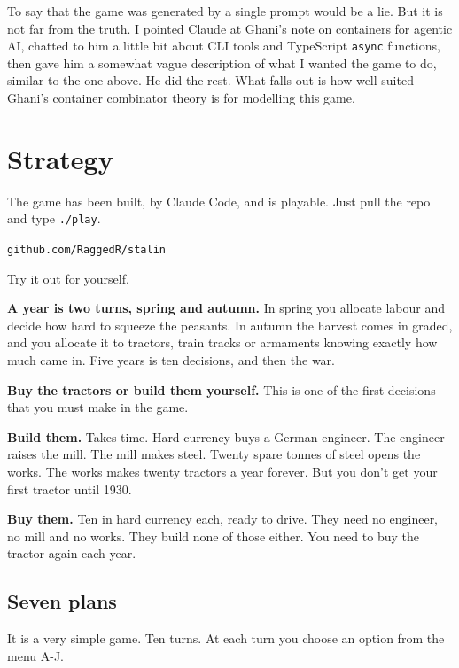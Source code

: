 \documentclass[11pt,a4paper]{article}
\begin{document}
To say that the game was generated by a single prompt would be a lie. But it is not far from the
truth. I pointed Claude at Ghani's note on containers for agentic AI, chatted to him a little bit
about CLI tools and TypeScript \texttt{async} functions, then gave him a somewhat vague description
of what I wanted the game to do, similar to the one above. He did the rest. What falls out is how
well suited Ghani's container combinator theory is for modelling this game.


\newpage

\section{Strategy}
\label{sec:strategy}

\begin{sectionbox}
The game has been built, by Claude Code, and is playable. Just pull the repo and type
\texttt{./play}.

\begin{center}
\texttt{github.com/RaggedR/stalin}
\end{center}

Try it out for yourself.
\end{sectionbox}

\textbf{A year is two turns, spring and autumn.} In spring you allocate labour and decide how hard
to squeeze the peasants. In autumn the harvest comes in graded, and you allocate it to tractors,
train tracks or armaments knowing exactly how much came in. Five years is ten decisions, and then
the war.

\textbf{Buy the tractors or build them yourself.} This is one of the first decisions that you must
make in the game.

\textbf{Build them.} Takes time. Hard currency buys a German engineer. The engineer raises the
mill. The mill makes steel. Twenty spare tonnes of steel opens the works. The works makes twenty
tractors a year forever. But you don't get your first tractor until 1930.

\textbf{Buy them.} Ten in hard currency each, ready to drive. They need no engineer, no mill and no
works. They build none of those either. You need to buy the tractor again each year.

\subsection{Seven plans}

It is a very simple game. Ten turns. At each turn you choose an option from the menu A-J.
\end{document}
